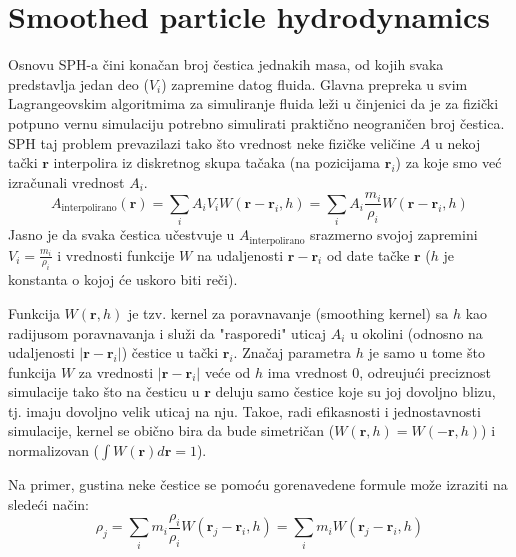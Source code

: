 \documentclass[12pt]{article}
\renewcommand{\vec}[1]{\mathbf{#1}}
\begin{document}
\section{Smoothed particle hydrodynamics}
    Osnovu SPH-a \v cini kona\v can broj \v cestica jednakih masa, od kojih svaka predstavlja jedan deo ($V_i$) zapremine datog fluida.
    Glavna prepreka u svim Lagrangeovskim algoritmima za simuliranje fluida le\v zi u \v cinjenici da je za fizi\v cki potpuno vernu simulaciju potrebno simulirati prakti\v cno neograni\v cen broj \v cestica. SPH taj problem prevazilazi tako \v sto vrednost neke fizi\v cke veli\v cine $A$ u nekoj ta\v cki $\vec{r}$ interpolira iz diskretnog skupa ta\v caka (na pozicijama $\vec{r}_i$) za koje smo ve\'c izra\v cunali vrednost $A_i$.
    \begin{equation}\label{eq:SPH interpolacija}
        A_\text{interpolirano}(\vec{r}) = \sum_i{A_i V_i W(\vec{r}-\vec{r}_i, h)} = \sum_i{A_i \frac{m_i}{\rho_i} W(\vec{r}-\vec{r}_i, h)}
    \end{equation}
    Jasno je da svaka \v cestica u\v cestvuje u $A_\text{interpolirano}$ srazmerno svojoj zapremini $V_i=\frac{m_i}{\rho_i}$ i vrednosti funkcije $W$ na udaljenosti $\vec{r}-\vec{r}_i$ od date ta\v cke $\vec{r}$ ($h$ je konstanta o kojoj \'ce uskoro biti re\v ci).

    Funkcija $W(\vec{r}, h)$ je tzv. kernel za poravnavanje (smoothing kernel) sa $h$ kao radijusom poravnavanja i slu\v zi da "rasporedi" uticaj $A_i$ u okolini (odnosno na udaljenosti $|\vec{r}-\vec{r}_i|$) \v cestice u ta\v cki $\vec{r}_i$. Zna\v caj parametra $h$ je samo u tome \v sto funkcija $W$ za vrednosti $|\vec{r}-\vec{r}_i|$ ve\'ce od $h$ ima vrednost 0, odre\dj uju\'ci preciznost simulacije tako \v sto na \v cesticu u $\vec{r}$ deluju samo \v cestice koje su joj dovoljno blizu, tj. imaju dovoljno velik uticaj na nju. Tako\dj e, radi efikasnosti i jednostavnosti simulacije, kernel se obi\v cno bira da bude simetri\v can ($W(\vec{r}, h)=W(-\vec{r}, h)$) i normalizovan ($\int W(\vec{r})d\vec{r}=1$).

    Na primer, gustina neke \v cestice se pomo\'cu gorenavedene formule mo\v ze izraziti na slede\'ci na\v cin:
    \begin{equation}\label{eq:SPH interpolacija gustine}
    \rho_j=\sum_i{m_i \frac{\rho_i}{\rho_i} W(\vec{r}_j-\vec{r}_i, h)}=\sum_i{m_i W(\vec{r}_j-\vec{r}_i, h)}
    \end{equation}
\end{document}
